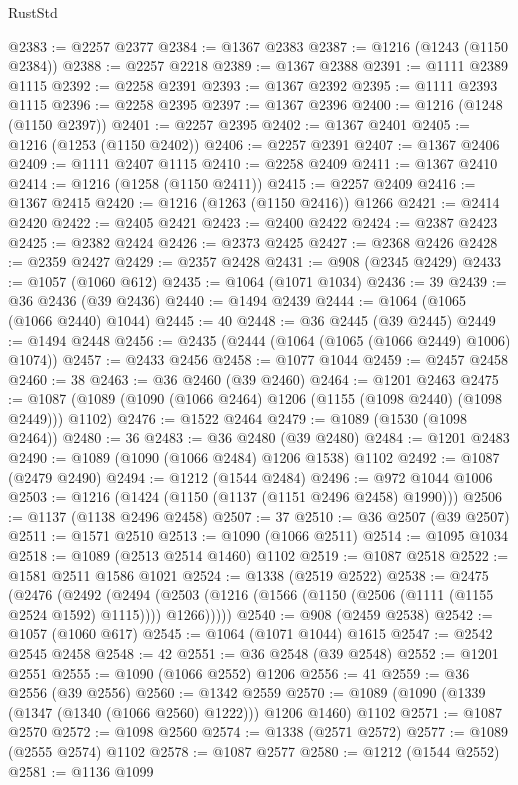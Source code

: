 \begin{lexlean}{RustStd}
\begin{coremodule}
@2383 := @2257 @2377
@2384 := @1367 @2383
@2387 := @1216 (@1243 (@1150 @2384))
@2388 := @2257 @2218
@2389 := @1367 @2388
@2391 := @1111 @2389 @1115
@2392 := @2258 @2391
@2393 := @1367 @2392
@2395 := @1111 @2393 @1115
@2396 := @2258 @2395
@2397 := @1367 @2396
@2400 := @1216 (@1248 (@1150 @2397))
@2401 := @2257 @2395
@2402 := @1367 @2401
@2405 := @1216 (@1253 (@1150 @2402))
@2406 := @2257 @2391
@2407 := @1367 @2406
@2409 := @1111 @2407 @1115
@2410 := @2258 @2409
@2411 := @1367 @2410
@2414 := @1216 (@1258 (@1150 @2411))
@2415 := @2257 @2409
@2416 := @1367 @2415
@2420 := @1216 (@1263 (@1150 @2416)) @1266
@2421 := @2414 @2420
@2422 := @2405 @2421
@2423 := @2400 @2422
@2424 := @2387 @2423
@2425 := @2382 @2424
@2426 := @2373 @2425
@2427 := @2368 @2426
@2428 := @2359 @2427
@2429 := @2357 @2428
@2431 := @908 (@2345 @2429)
@2433 := @1057 (@1060 @612)
@2435 := @1064 (@1071 @1034)
@2436 := 39
@2439 := @36 @2436 (@39 @2436)
@2440 := @1494 @2439
@2444 := @1064 (@1065 (@1066 @2440) @1044)
@2445 := 40
@2448 := @36 @2445 (@39 @2445)
@2449 := @1494 @2448
@2456 := @2435 (@2444 (@1064 (@1065 (@1066 @2449) @1006) @1074))
@2457 := @2433 @2456
@2458 := @1077 @1044
@2459 := @2457 @2458
@2460 := 38
@2463 := @36 @2460 (@39 @2460)
@2464 := @1201 @2463
@2475 := @1087 (@1089 (@1090 (@1066 @2464) @1206 (@1155 (@1098 @2440) (@1098 @2449))) @1102)
@2476 := @1522 @2464
@2479 := @1089 (@1530 (@1098 @2464))
@2480 := 36
@2483 := @36 @2480 (@39 @2480)
@2484 := @1201 @2483
@2490 := @1089 (@1090 (@1066 @2484) @1206 @1538) @1102
@2492 := @1087 (@2479 @2490)
@2494 := @1212 (@1544 @2484)
@2496 := @972 @1044 @1006
@2503 := @1216 (@1424 (@1150 (@1137 (@1151 @2496 @2458) @1990)))
@2506 := @1137 (@1138 @2496 @2458)
@2507 := 37
@2510 := @36 @2507 (@39 @2507)
@2511 := @1571 @2510
@2513 := @1090 (@1066 @2511)
@2514 := @1095 @1034
@2518 := @1089 (@2513 @2514 @1460) @1102
@2519 := @1087 @2518
@2522 := @1581 @2511 @1586 @1021
@2524 := @1338 (@2519 @2522)
@2538 := @2475
    (@2476
      (@2492
        (@2494 (@2503 (@1216 (@1566 (@1150 (@2506 (@1111 (@1155 @2524 @1592) @1115)))) @1266)))))
@2540 := @908 (@2459 @2538)
@2542 := @1057 (@1060 @617)
@2545 := @1064 (@1071 @1044) @1615
@2547 := @2542 @2545 @2458
@2548 := 42
@2551 := @36 @2548 (@39 @2548)
@2552 := @1201 @2551
@2555 := @1090 (@1066 @2552) @1206
@2556 := 41
@2559 := @36 @2556 (@39 @2556)
@2560 := @1342 @2559
@2570 := @1089 (@1090 (@1339 (@1347 (@1340 (@1066 @2560) @1222))) @1206 @1460) @1102
@2571 := @1087 @2570
@2572 := @1098 @2560
@2574 := @1338 (@2571 @2572)
@2577 := @1089 (@2555 @2574) @1102
@2578 := @1087 @2577
@2580 := @1212 (@1544 @2552)
@2581 := @1136 @1099

\end{coremodule}
\end{lexlean}
